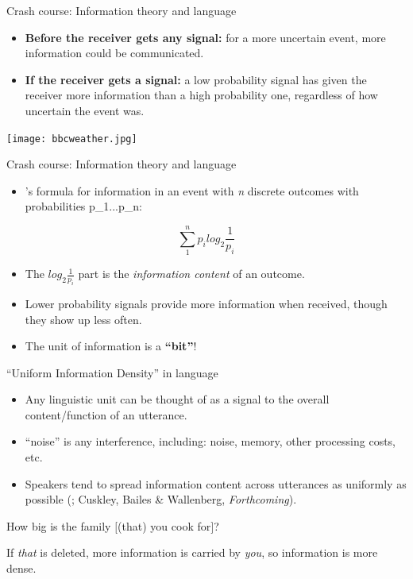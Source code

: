 \documentclass[hyperref={pdfpagelabels=false}]{beamer}
\begin{document}
\begin{frame}{Crash course: Information theory and language} 
	\begin{itemize}
		\item \textbf{Before the receiver gets any signal:} for a more uncertain event, more information could be communicated.
		\item \textbf{If the receiver gets a signal:} a low probability signal has given the receiver more information than a high probability one, regardless of how uncertain the event was. 
	\end{itemize}
	\begin{center}
			\texttt{[image: bbcweather.jpg]} 
	\end{center}
\end{frame}


\begin{frame}{Crash course: Information theory and language} 
	\begin{itemize}
		\item \citet{shannon1948}'s formula for information in an event with \textsl{n} discrete outcomes with probabilities p_1...p_n:
	\end{itemize}
	\begin{center}
		$$\sum_{1}^{n} p_i log_2 \frac{1}{p_i}$$
	\end{center}
	\begin{itemize}
		\item The $log_2 \frac{1}{p_i}$ part is the \textsl{information content} of an outcome.
		\item Lower probability signals provide more information when received, though they show up less often.
		\item The unit of information is a \textbf{``bit''}!
	\end{itemize}
	
\end{frame}


\begin{frame}{``Uniform Information Density'' in language} 
\begin{itemize}
	\item Any linguistic unit can be thought of as a signal to the overall content/function of an utterance.
	\item ``noise'' is any interference, including: noise, memory, other processing costs, etc.
	\item Speakers tend to spread information content across utterances as uniformly as possible \small{(\citealt{fenkfenk1980,aylettturk2004,levyjaeger2007}; Cuskley, Bailes \& Wallenberg, \textsl{Forthcoming})}.\nocite{cuskleyWallenberg2021}
\end{itemize}
\begin{exe}
	\ex How big is the family $[$(that) you cook for$]$?
\end{exe}

\begin{center}
	If \textsl{that} is deleted, more information is carried by \textsl{you}, so information is more dense.
\end{center}


\end{frame}
\end{document}
